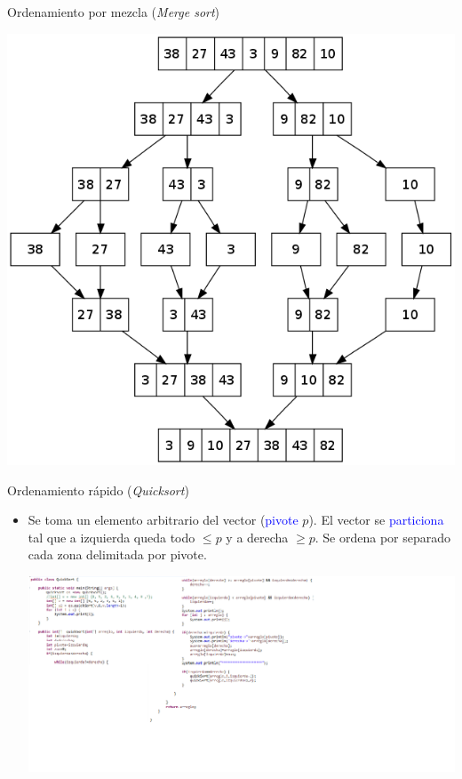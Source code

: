 \documentclass{beamer} %
\newcommand{\blue}[1]{\textcolor{blue}{#1}}
\begin{document}
\begin{frame}{Ordenamiento por mezcla ({\em Merge sort})}
    \begin{center}
        \includegraphics[width=.65\textwidth]{./image/cap5/merge-sort2.png}
    \end{center}
\end{frame}

\begin{frame}{Ordenamiento rápido ({\em Quicksort})}
    \begin{itemize}
        \item Se toma un elemento arbitrario del vector (\blue{pivote} $p$). El vector se \blue{particiona} tal que a izquierda queda todo $\leq p$ y a derecha $\geq p$. Se ordena por separado cada zona delimitada por pivote.
        \vspace{2ex}

        \begin{center}
            \includegraphics[width=1.5\textwidth]{./image/cap5/quicksort4.png}
        \end{center}
    \end{itemize}
\end{frame}
\end{document}
